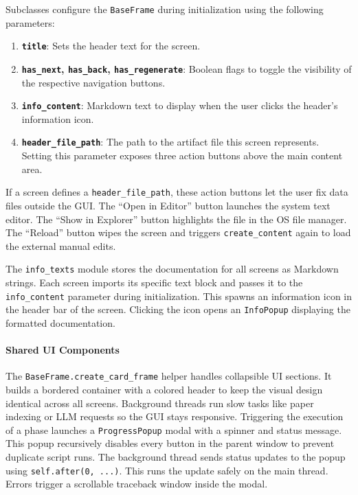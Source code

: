 Subclasses configure the \texttt{BaseFrame} during initialization using the following parameters:

\begin{enumerate}[nosep]
	\item \textbf{\texttt{title}}: Sets the header text for the screen.
	\item \textbf{\texttt{has\_next}, \texttt{has\_back}, \texttt{has\_regenerate}}: Boolean flags to toggle the visibility of the respective navigation buttons.
	\item \textbf{\texttt{info\_content}}: Markdown text to display when the user clicks the header's information icon.
	\item \textbf{\texttt{header\_file\_path}}: The path to the artifact file this screen represents. Setting this parameter exposes three action buttons above the main content area.
\end{enumerate}

If a screen defines a \texttt{header\_file\_path}, these action buttons let the user fix data files outside the GUI.
The ``Open in Editor'' button launches the system text editor.
The ``Show in Explorer'' button highlights the file in the OS file manager.
The ``Reload'' button wipes the screen and triggers \texttt{create\_content} again to load the external manual edits.

The \texttt{info\_texts} module stores the documentation for all screens as Markdown strings.
Each screen imports its specific text block and passes it to the \texttt{info\_content} parameter during initialization.
This spawns an information icon in the header bar of the screen.
Clicking the icon opens an \texttt{InfoPopup} displaying the formatted documentation.

\paragraph{Shared UI Components}
The \texttt{BaseFrame.create\_card\_frame} helper handles collapsible UI sections.
It builds a bordered container with a colored header to keep the visual design identical across all screens.
Background threads run slow tasks like paper indexing or LLM requests so the GUI stays responsive.
Triggering the execution of a phase launches a \texttt{ProgressPopup} modal with a spinner and status message.
This popup recursively disables every button in the parent window to prevent duplicate script runs.
The background thread sends status updates to the popup using \texttt{self.after(0, ...)}.
This runs the update safely on the main thread.
Errors trigger a scrollable traceback window inside the modal.

